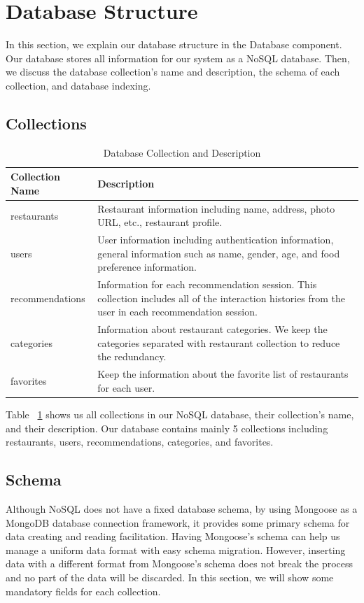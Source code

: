 \documentclass[12pt,oneside,openright,a4paper]{cpe-english-project}
\begin{document}
\section{Database Structure}
In this section, we explain our database structure in the Database component. Our database stores all information for our system as a NoSQL database. Then, we discuss the database collection’s name and description, the schema of each collection, and database indexing.

\newpage
\subsection{Collections}
\begin{table}[H]
\caption{Database Collection and Description}\label{tbl:3DatabaseCollectionandDescription}
\begin{tabularx}{\textwidth}{l|X} \hline\hline
Collection Name & Description \\ \hline\hline
restaurants & Restaurant information including name, address, photo URL, etc., restaurant profile. \\ \hline
users & User information including authentication information, general information such as name, gender, age, and food preference information. \\ \hline
recommendations & Information for each recommendation session. This collection includes all of the interaction histories from the user in each recommendation session. \\ \hline
categories & Information about restaurant categories. We keep the categories separated with restaurant collection to reduce the redundancy. \\ \hline
favorites & Keep the information about the favorite list of restaurants for each user. \\ \hline\hline
\end{tabularx}
\end{table}

Table ~\ref{tbl:3DatabaseCollectionandDescription} shows us all collections in our NoSQL database, their collection’s name, and their description. Our database contains mainly 5 collections including restaurants, users, recommendations, categories, and favorites.

\subsection{Schema}

Although NoSQL does not have a fixed database schema, by using Mongoose as a MongoDB database connection framework, it provides some primary schema for data creating and reading facilitation. Having Mongoose’s schema can help us manage a uniform data format with easy schema migration. However, inserting data with a different format from Mongoose’s schema does not break the process and no part of the data will be discarded. In this section, we will show some mandatory fields for each collection.
\end{document}
